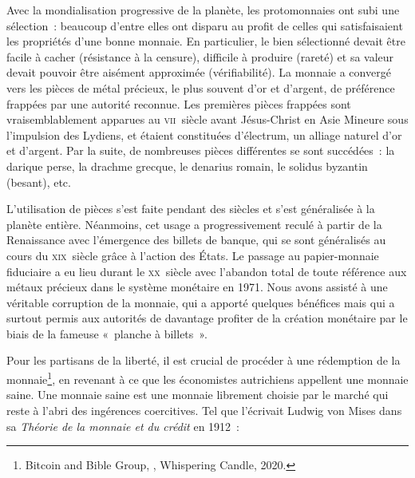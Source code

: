Avec la mondialisation progressive de la planète, les protomonnaies ont subi une sélection~: beaucoup d'entre elles ont disparu au profit de celles qui satisfaisaient les propriétés d'une bonne monnaie. En particulier, le bien sélectionné devait être facile à cacher (résistance à la censure), difficile à produire (rareté) et sa valeur devait pouvoir être aisément approximée (vérifiabilité). La monnaie a convergé vers les pièces de métal précieux, le plus souvent d'or et d'argent, de préférence frappées par une autorité reconnue. Les premières pièces frappées sont vraisemblablement apparues au \textsc{vii}\ieme{}~siècle avant Jésus-Christ en Asie Mineure sous l'impulsion des Lydiens, et étaient constituées d'électrum, un alliage naturel d'or et d'argent. Par la suite, de nombreuses pièces différentes se sont succédées~: la darique perse, la drachme grecque, le denarius romain, le solidus byzantin (besant), etc.


L'utilisation de pièces s'est faite pendant des siècles et s'est généralisée à la planète entière. Néanmoins, cet usage a progressivement reculé à partir de la Renaissance avec l'émergence des billets de banque, qui se sont généralisés au cours du \textsc{xix}\ieme{}~siècle grâce à l'action des États. Le passage au papier-monnaie fiduciaire a eu lieu durant le \textsc{xx}\ieme{}~siècle avec l'abandon total de toute référence aux métaux précieux dans le système monétaire en 1971. Nous avons assisté à une véritable corruption de la monnaie, qui a apporté quelques bénéfices mais qui a surtout permis aux autorités de davantage profiter de la création monétaire par le biais de la fameuse «~planche à billets~». %


Pour les partisans de la liberté, il est crucial de procéder à une rédemption de la monnaie\footnote{Bitcoin and Bible Group, , Whispering Candle, 2020.}, en revenant à ce que les économistes autrichiens appellent une monnaie saine. Une monnaie saine est une monnaie librement choisie par le marché qui reste à l'abri des ingérences coercitives. Tel que l'écrivait Ludwig von Mises dans sa \emph{Théorie de la monnaie et du crédit} en 1912~:

